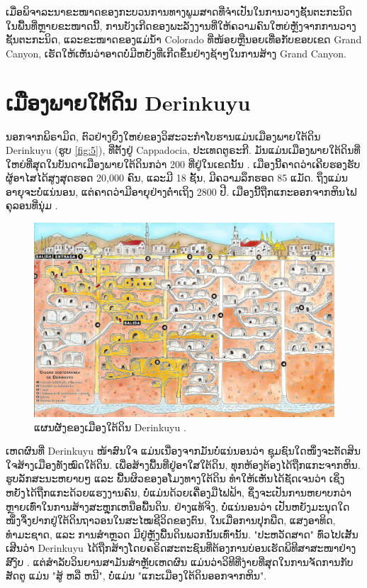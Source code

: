 \documentclass[10pt,twocolumn,letterpaper]{article}
\begin{document}
ເມື່ອພິຈາລະນາຂະໜາດຂອງກະບວນການທາງພູມສາດທີ່ຈຳເປັນໃນການວາງຊັ້ນຕະກະນິດໃນພື້ນທີ່ຫຼາຍຂະໜາດນີ້, ການບັງເກີດຂອງພະລັງງານທີ່ໃຫ້ຄວາມຄົນໃຫຍ່ຫຼັງຈາກການວາງຊັ້ນຕະກະນິດ, ແລະຂະໜາດຂອງແມ່ນ້ຳ Colorado ທີ່ໜ້ອຍຫຼືນອຍເທື່ອກັບຂອບເຂດ Grand Canyon, ເຮັດໃຫ້ເຫັນວ່າອາດບໍ່ມີຫຍັງທີ່ເກີດຂຶ້ນຢ່າງຊ້າໆໃນການສ້າງ Grand Canyon.

\section{ເມືອງພາຍໃຕ້ດິນ Derinkuyu}

ນອກຈາກພິຣາມິດ, ຕົວຢ່າງຍິ່ງໃຫຍ່ຂອງວິສະວະກຳໂບຮານແມ່ນເມືອງພາຍໃຕ້ດິນ Derinkuyu (ຮູບ \ref{fig:5}), ທີ່ຕັ້ງຢູ່ Cappadocia, ປະເທດຕູຣະກີ. ມັນແມ່ນເມືອງພາຍໃຕ້ດິນທີ່ໃຫຍ່ທີ່ສຸດໃນບັນດາເມືອງພາຍໃຕ້ດິນກວ່າ 200 ທີ່ຢູ່ໃນເຂດນັ້ນ \cite{54}. ເມືອງນີ້ຄາດວ່າເຄີຍຮອງຮັບຜູ້ອາໄສໄດ້ສູງສຸດຮອດ 20,000 ຄົນ, ແລະມີ 18 ຊັ້ນ, ມີຄວາມລຶກຮອດ 85 ແມັດ. ຖຶງແມ່ນອາຍຸຈະບໍ່ແນ່ນອນ, ແຕ່ຄາດວ່າມີອາຍຸຢ່າງຕໍ່າເຖິງ 2800 ປີ. ເມືອງນີ້ຖືກແກະອອກຈາກຫິນໄຟຄຸລອນທີ່ນຸ່ມ \cite{52, 53}.

\begin{figure}[b]
\begin{center}
\includegraphics[width=1\linewidth]{derinkuyu.jpeg}
\end{center}
   \caption{ແຜນຜັງຂອງເມືອງໃຕ້ດິນ Derinkuyu \cite{56}.}
\label{fig:5}
\label{fig:onecol}
\end{figure}

ເຫດຜົນທີ່ Derinkuyu ໜ້າສົນໃຈ ແມ່ນເນື່ອງຈາກມັນບໍ່ແນ່ນອນວ່າ ຊຸມຊົນໃດໜຶ່ງຈະຕັດສິນໃຈສ້າງເມືອງທັງໝົດໃຕ້ດິນ. ເພື່ອສ້າງພື້ນທີ່ຢູ່ອາໃສໃຕ້ດິນ, ທຸກຫ້ອງຕ້ອງໄດ້ຖືກແກະຈາກຫິນ. ຮູບລັກສະນະຫຍາບໆ ແລະ ພື້ນຜິວຂອງອໂມງທາງໃຕ້ດິນ ທຳໃຫ້ເຫັນໄດ້ຊັດເຈນວ່າ ເຊິ່ງຫຍັງໄດ້ຖືກແກະດ້ວຍແຮງງານຄົນ, ບໍ່ແມ່ນດ້ວຍເຄື່ອງມືໄຟຟ້າ, ຊຶ່ງຈະເປັນການຫຍາບກວ່າຫຼາຍເທົ່າໃນການສ້າງສະຫຼຸກເຫນືອພື້ນດິນ. ຢ່າງແທ້ຈິງ, ບໍ່ແນ່ນອນວ່າ ເປັນຫຍັງມະນຸດໃດໜຶ່ງຈຶ່ງຢາກຢູ່ໃຕ້ດິນຖາວອນໃນສະໄໝຊີວິດຂອງຕົນ, ໃນເມື່ອການປຸກພືດ, ແສງອາທິດ, ທຳມະຊາດ, ແລະ ການສຳຫຼວດ ມີຢູ່ຫຼັງພື້ນດິນພວກນັ້ນເທົ່ານັ້ນ. "ປະຫວັດສາດ" ທົ່ວໄປເສັ້ນເສີນວ່າ Derinkuyu ໄດ້ຖືກສ້າງໂດຍຄຣິດສະຕະຊົນທີ່ຕ້ອງການບ່ອນເຮັດພິທີສາສະໜາຢ່າງສົງົບ \cite{53}. ແຕ່ສຳລັບວິນຍານສາມັນສຳຫຼັບເຫດຜົນ ແມ່ນວ່າວິທີທີ່ງ່າຍທີ່ສຸດໃນການຈັດການກັບສັດຕູ ແມ່ນ "ສູ້ ຫລື ຫນີ", ບໍ່ແມ່ນ "ແກະເມືອງໃຕ້ດິນອອກຈາກຫິນ".
\end{document}
